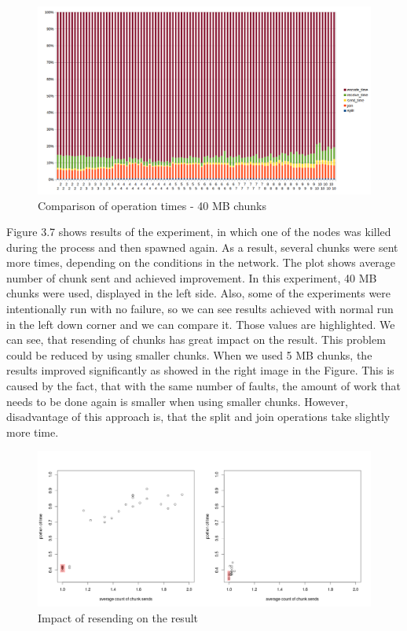 \begin{figure}[h]
\begin{center}
\includegraphics[scale=0.5]{./img/comparison_chart40k.png}
\caption{Comparison of operation times - 40 MB chunks}
\end{center}
\end{figure}

Figure 3.7 shows results of the experiment, in which one of the nodes
was killed during the process and then spawned again. As a result,
several chunks were sent more times, depending on the conditions in the
network. The plot shows average number of chunk sent and achieved
improvement. In this experiment, 40 MB chunks were used, displayed in
the left side. Also, some of the experiments were intentionally run with
no failure, so we can see results achieved with normal run in the left
down corner and we can compare it. Those values are highlighted. We can
see, that resending of chunks has great impact on the result. This
problem could be reduced by using smaller chunks. When we used 5 MB
chunks, the results improved significantly as showed in the right image
in the Figure. This is caused by the fact, that with the same number of
faults, the amount of work that needs to be done again is smaller when
using smaller chunks. However, disadvantage of this approach is, that
the split and join operations take slightly more time.

\begin{figure}[h]
\begin{center}
\includegraphics[scale=0.30]{./img/failures_both.png}
\caption{Impact of resending on the result}
\end{center}
\end{figure}

